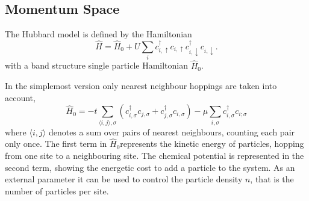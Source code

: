 \documentclass[a4paper,10pt]{report}
\begin{document}

\subsection{Momentum Space}

The Hubbard model is defined by the Hamiltonian
\begin{equation}
 \hat{H} = \hat{H}_0
	   + U \sum_i c^{\dagger}_{i,\uparrow}c_{i,\uparrow} c^{\dagger}_{i,\downarrow}c_{i,\downarrow} 
	    . \label{Hubbard_space}
\end{equation}
with a band structure single particle Hamiltonian $\hat{H}_0$.


In the simplemost version only nearest neighbour hoppings are taken into account,
\begin{equation}
 \hat{H}_0 = - t \sum_{\langle i,j \rangle,\sigma} \left (c^{\dagger}_{i,\sigma}c_{j,\sigma} + c^{\dagger}_{j,\sigma}c_{i,\sigma} \right) 	    -\mu \sum_{i,\sigma} c^{\dagger}_{i,\sigma}c_{i;\sigma}
\end{equation}
where $\langle i,j \rangle$ denotes a sum over pairs of nearest neighbours, counting each pair only once.
The first term in $\hat{H}_0$represents the kinetic energy of particles, hopping from one site to a neighbouring site.
The chemical potential is represented in the second term, showing the energetic cost to add a particle to the system.
As an external parameter it can be used to control the particle density $n$, that is the number of particles per site.
\end{document}
